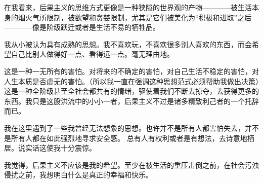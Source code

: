 \documentclass[10pt]{article}
\begin{document}
  在我看来，后果主义的思维方式更像是一种狭隘的世界观的产物————被生活本身的烟火气所限制，被欲望和贪婪限制，尤其是它们被美化为“积极和进取”之后————像是阶级跃迁或者是生活不易的牺牲品。

  我从小被认为具有成熟的思想。我不喜欢玩，不喜欢很多别人喜欢的东西，而会希望自己比别人做得好一点、看得远一点。毫无理由地。

  这是一种一无所有的害怕。对将来的不确定的害怕，对自己生活不稳定的害怕，对人生本质是否虚无的害怕。（所以我一直在强调这种思想范式必须帮助我做出决策）这是一种全阶级甚至全社会都共有的情绪，驱使着我们不断去掠夺，去获得更多的东西。我只是这股洪流中的小小一者，后果主义不过是诸多精致利己者的一个托辞而已。

  我在这里遇到了一些我曾经无法想象的思想。也许并不是所有人都害怕失去，并不是所有人都在如此强烈地寻求安全感。 总有人有权利或者是有想法，去诗意地栖居。说实话这使我十分震惊。
  
  我觉得，后果主义不应该是我的希望。至少在被生活的重压击倒之前，在社会污浊侵扰之前，我想明白什么是真正的幸福和快乐。





\end{document}
